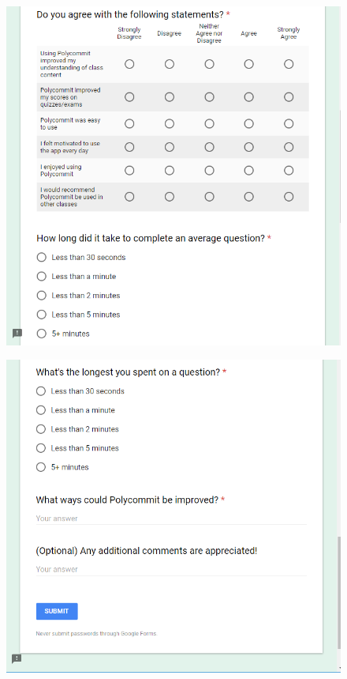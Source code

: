 \begin{figure}[h!]
	\includegraphics[width=1.0\linewidth]{figures/survey2}
	\label{fig:survey2}
\end{figure}

\begin{figure}[h!]
	\includegraphics[width=1.0\linewidth]{figures/survey3}
	\label{fig:survey3}
\end{figure}

